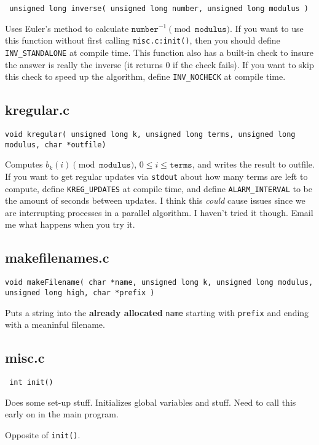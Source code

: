 \documentclass[11pt]{article}
\newcommand{\void}{\textcolor{OliveGreen}{void }}
\newcommand{\ul}{ \textcolor{OliveGreen}{unsigned long }}
\newcommand{\ch}{ \textcolor{OliveGreen}{char }}
\newcommand{\integer}{ \textcolor{OliveGreen}{int }}
\begin{document}
{ \tiny
\texttt{\ul inverse( \ul number, \ul modulus )}
}

Uses Euler's method to calculate $\texttt{number}^{-1} \pmod{\texttt{modulus}}$.
If you want to use this function without first calling \texttt{misc.c:init()},
then you should define \texttt{INV\_STANDALONE} at compile time.
This function also has a built-in check to insure the answer is really the inverse (it returns 0 if the check fails).
If you want to skip this check to speed up the algorithm, define \texttt{INV\_NOCHECK} at compile time.

\subsection{kregular.c}

{ \tiny
\texttt{\void kregular(\ul k, \ul terms, \ul modulus, \ch *outfile)}
}

Computes $b_k(i) \pmod{\texttt{modulus}}$, $0 \leq i \leq \texttt{terms}$, and writes the result to outfile.
If you want to get regular updates via \texttt{stdout} about how many terms are left to compute,
define \texttt{KREG\_UPDATES} at compile time, and define \texttt{ALARM\_INTERVAL} to be the amount of seconds between updates.
I think this \textit{could} cause issues since we are interrupting processes in a parallel algorithm. I haven't tried it though.
Email me what happens when you try it.

\subsection{makefilenames.c}

{ \tiny
\texttt{\void makeFilename( \ch *name, \ul k, \ul modulus, \ul high, \ch *prefix )}
}

Puts a string into the {\bfseries already allocated} \texttt{name} starting with \texttt{prefix} and ending with a meaninful filename.

\subsection{misc.c}

{ \tiny
\texttt{\integer init()}
}

Does some set-up stuff. Initializes global variables and stuff. Need to call this early on in the main program.

\noindent { \tiny
\texttt{\void teardown()}
}

Opposite of \texttt{init()}.
\end{document}
